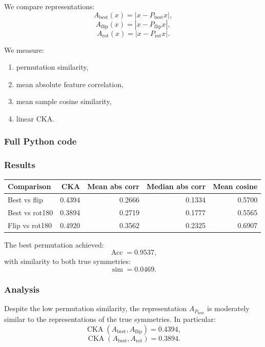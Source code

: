 \documentclass[11pt,a4paper]{report}
\begin{document}
We compare representations:
\[
A_{\mathrm{best}}(x)=|x-P_{\mathrm{best}}x|,
\]
\[
A_{\mathrm{flip}}(x)=|x-P_{\mathrm{flip}}x|,
\]
\[
A_{\mathrm{rot}}(x)=|x-P_{\mathrm{rot}}x|.
\]

We measure:
\begin{enumerate}
\item permutation similarity,
\item mean absolute feature correlation,
\item mean sample cosine similarity,
\item linear CKA.
\end{enumerate}

\subsubsection{Full Python code}

\noindent{}


\subsubsection{Results}

\begin{center}
\begin{tabular}{lrrrr}
\toprule
Comparison & CKA & Mean abs corr & Median abs corr & Mean cosine \\
\midrule
Best vs flip & 0.4394 & 0.2666 & 0.1334 & 0.5700 \\
Best vs rot180 & 0.3894 & 0.2719 & 0.1777 & 0.5565 \\
Flip vs rot180 & 0.4920 & 0.3562 & 0.2325 & 0.6907 \\
\bottomrule
\end{tabular}
\end{center}

The best permutation achieved:
\[
\operatorname{Acc}=0.9537,
\]
with similarity to both true symmetries:
\[
\operatorname{sim}=0.0469.
\]

\subsubsection{Analysis}

Despite the low permutation similarity, the representation $A_{P_{\mathrm{best}}}$ is moderately similar to the representations of the true symmetries. In particular:
\[
\operatorname{CKA}(A_{\mathrm{best}},A_{\mathrm{flip}})=0.4394,
\]
\[
\operatorname{CKA}(A_{\mathrm{best}},A_{\mathrm{rot}})=0.3894.
\]
\end{document}
